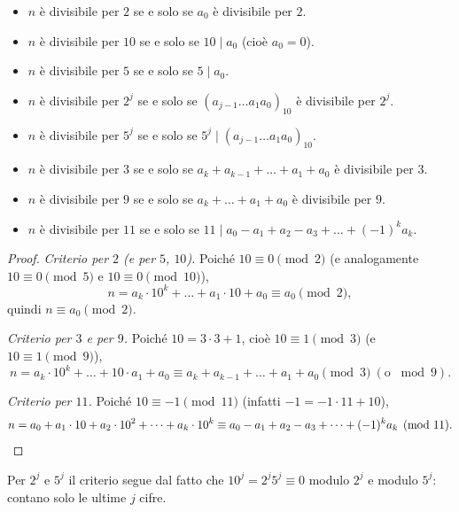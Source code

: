 \documentclass[11pt,a4paper]{article}
\begin{document}
\begin{proposizione}
\begin{itemize}
  \item $n$ è divisibile per $2$ se e solo se $a_0$ è divisibile per $2$.
  \item $n$ è divisibile per $10$ se e solo se $10 \mid a_0$ (cioè $a_0 = 0$).
  \item $n$ è divisibile per $5$ se e solo se $5 \mid a_0$.
  \item $n$ è divisibile per $2^j$ se e solo se $(a_{j-1}\dots a_1 a_0)_{10}$ è divisibile per $2^j$.
  \item $n$ è divisibile per $5^j$ se e solo se $5^j \mid (a_{j-1}\dots a_1 a_0)_{10}$.
  \item $n$ è divisibile per $3$ se e solo se $a_k + a_{k-1} + \dots + a_1 + a_0$ è divisibile per $3$.
  \item $n$ è divisibile per $9$ se e solo se $a_k + \dots + a_1 + a_0$ è divisibile per $9$.
  \item $n$ è divisibile per $11$ se e solo se $11 \mid a_0 - a_1 + a_2 - a_3 + \dots + (-1)^k a_k$.
\end{itemize}
\end{proposizione}

\begin{proof}
\emph{Criterio per $2$ (e per $5$, $10$).} Poiché $10 \equiv 0 \pmod 2$ (e analogamente $10 \equiv 0 \pmod 5$ e $10 \equiv 0 \pmod{10}$),
\[
  n = a_k\cdot 10^k + \dots + a_1\cdot 10 + a_0 \equiv a_0 \pmod 2 ,
\]
quindi $n \equiv a_0 \pmod 2$.

\emph{Criterio per $3$ e per $9$.} Poiché $10 = 3\cdot 3 + 1$, cioè $10 \equiv 1 \pmod 3$ (e $10 \equiv 1 \pmod 9$),
\[
  n = a_k\cdot 10^k + \dots + 10\cdot a_1 + a_0 \equiv a_k + a_{k-1} + \dots + a_1 + a_0 \pmod 3 \ (\text{o } \bmod 9).
\]

\emph{Criterio per $11$.} Poiché $10 \equiv -1 \pmod{11}$ (infatti $-1 = -1\cdot 11 + 10$),
\[
  n = a_0 + a_1\cdot 10 + a_2\cdot 10^2 + \dots + a_k\cdot 10^k \equiv a_0 - a_1 + a_2 - a_3 + \dots + (-1)^k a_k \pmod{11}. \qedhere
\]
\end{proof}

\begin{osservazione}
Per $2^j$ e $5^j$ il criterio segue dal fatto che $10^j = 2^j 5^j \equiv 0$ modulo $2^j$ e modulo $5^j$: contano solo le ultime $j$ cifre.
\end{osservazione}
\end{document}
